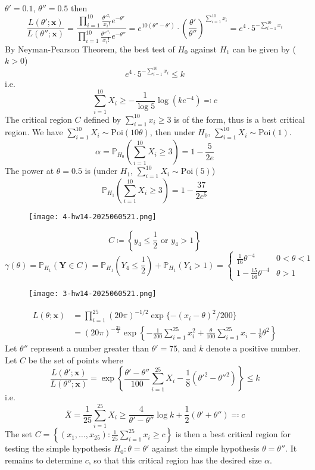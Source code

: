 $\theta'=0.1$, $\theta''=0.5$ then
\[
\frac{L(\theta';\mathbf{x})}{L(\theta'';\mathbf{x})}=\frac{\prod_{i=1}^{10} \frac{\theta'^{x_i}}{x_i!}e^{ -\theta' }}{\prod_{i=1}^{10} \frac{\theta''^{x_i}}{x_i!}e^{ -\theta'' }}=e^{ 10(\theta''-\theta') }\cdot\left( \frac{\theta'}{\theta''} \right)^{\sum_{i=1}^{10} x_i}=e^{ 4 }\cdot5^{-\sum_{i=1}^{10} x_i}
\]
By Neyman-Pearson Theorem, the best test of $H_0$ against $H_1$ can be given by ($k>0$)
\[
e^{ 4 }\cdot5^{-\sum_{i=1}^{10} x_i}\leq k
\]
i.e.
\[
\sum_{i=1}^{10} X_i\geq -\frac{1}{\log5}\log(ke^{ -4 })\eqqcolon c
\]
The critical region $C$ defined by $\sum_{i=1}^{10}x_i\geq3$ is of the form, thus is a best critical region. We have $\sum_{i=1}^{10}X_i\sim \mathrm{Poi}(10\theta)$, then under $H_0$, $\sum_{i=1}^{10}X_i\sim\text{Poi}(1)$.
\[
\alpha=\mathbb{P}_{H_0}\left( \sum_{i=1}^{10} X_i\geq 3 \right)=1-\frac{5}{2e}
\]
The power at $\theta=0.5$ is (under $H_1$, $\sum_{i=1}^{10}X_i\sim\text{Poi}(5)$)
\[
\mathbb{P}_{H_1}\left( \sum_{i=1}^{10} X_i\geq 3 \right)=1-\frac{37}{2e^{ 5 }}
\]
\begin{exercise}
\begin{figure}[H]
\centering
\texttt{[image: 4-hw14-2025060521.png]}
\label{}
\end{figure}
\end{exercise}
\[
C\coloneqq \left\{  y_4\leq \frac{1}{2}\text{ or }y_4>1  \right\}
\]
\[
\gamma(\theta)=\mathbb{P}_{H_1}(\mathbf{Y}\in C)=\mathbb{P}_{H_1}\left( Y_4\leq\frac{1}{2}  \right)+\mathbb{P}_{H_1}(Y_4>1)=\begin{cases}
\frac{1}{16} \theta^{-4} & 0<\theta< 1 \\
1-\frac{15}{16} \theta^{-4} & \theta>1
\end{cases}
\]
\begin{exercise}
\begin{figure}[H]
\centering
\texttt{[image: 3-hw14-2025060521.png]}
\label{}
\end{figure}
\end{exercise}
\[
\begin{aligned}
L(\theta;\mathbf{x}) & =\prod_{i=1}^{25} (20\pi)^{-1/2 }\exp \{ -(x_i-\theta)^2/200 \}  \\
 & =(20\pi)^{-\frac{25}{2}}\exp \left\{  -\frac{1}{200}\sum_{i=1}^{25} x_i^{2}+\frac{\theta}{100} \sum_{i=1}^{25} x_i-\frac{1}{8}\theta^{2}   \right\}
\end{aligned}
\]
Let $\theta''$ represent a number greater than $\theta'=75$, and $k$ denote a positive number. Let $C$ be the set of points where
\[
\frac{L(\theta';\mathbf{x})}{L(\theta'';\mathbf{x})}=\exp \left\{  \frac{\theta'-\theta''}{100}\sum_{i=1}^{25} X_i-\frac{1}{8}(\theta'^{2}-\theta''^{2})  \right\}\leq k
\]
i.e.
\[
\overline{X}=\frac{1}{25} \sum_{i=1}^{25} X_i\geq   \frac{4}{\theta'-\theta''}\log k+\frac{1}{2}(\theta'+\theta'')\eqqcolon c
\]
The set $C=\left\{  (x_1,\dots,x_{25}):\frac{1}{25}\sum_{i=1}^{25}x_i\geq c  \right\}$ is then a best critical region for testing the simple hypothesis $H_0:\theta=\theta'$ against the simple hypothesis $\theta=\theta''$. It remains to determine $c$, so that this critical region has the desired size $\alpha$.

